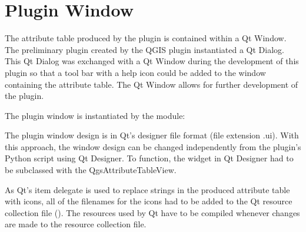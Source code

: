 \documentclass[a4paper,11pt,english]{sphinxmanual}
\begin{document}
\section{Plugin Window}
\label{\detokenize{pluginDesign:plugin-window}}
The attribute table produced by the plugin is contained within a Qt Window.  The preliminary plugin created by the QGIS  plugin instantiated a Qt Dialog.  This Qt Dialog was exchanged with a Qt Window during the development of this plugin so that a tool bar with a help icon could be added to the window containing the attribute table.  The Qt Window allows for further development of the plugin.

The plugin window is instantiated by the  module:

\begin{sphinxVerbatim}[commandchars=\\\{\}]
  
      
         
\end{sphinxVerbatim}

The plugin window design is in Qt’s designer file format (file extension .ui).  With this approach, the window design can be changed independently from the plugin’s Python script using Qt Designer.  To function, the  widget in Qt Designer had to be subclassed with the QgsAttributeTableView.

As Qt’s item delegate is used to replace strings in the produced attribute table with icons, all of the filenames for the icons had to be added to the Qt resource collection file ().  The resources used by Qt have to be compiled whenever changes are made to the resource collection file.
\end{document}
